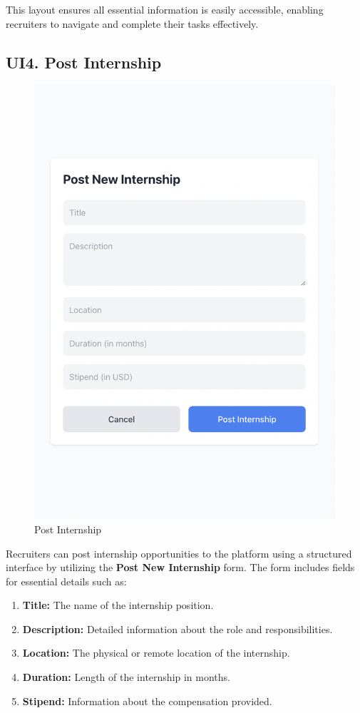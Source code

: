 This layout ensures all essential information is easily accessible, enabling recruiters to navigate and complete their tasks effectively.

\subsection{UI4. Post Internship}
\label{subsec:post_internship_ui}%

\begin{figure}[H]
    \begin{center}
        \includegraphics[width=0.62\linewidth]{JhaBhatiaSharma/imagesDD/PostInternship.png}
        \caption{Post Internship}
        \label{fig:postInternship}
    \end{center}
\end{figure}

Recruiters can post internship opportunities to the platform using a structured interface by utilizing the \textbf{Post New Internship} form. The form includes fields for essential details such as:
\begin{enumerate}
    \item \textbf{Title:} The name of the internship position.
    \item \textbf{Description:} Detailed information about the role and responsibilities.
    \item \textbf{Location:} The physical or remote location of the internship.
    \item \textbf{Duration:} Length of the internship in months.
    \item \textbf{Stipend:} Information about the compensation provided.
\end{enumerate}

